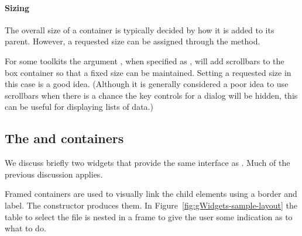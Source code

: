 



\paragraph{Sizing}
The overall size of a  container is typically decided by
how it is added to its parent. However, a requested size can be assigned
through the  method. 


For some toolkits the argument ,
when specified as , will add scrollbars to the box
container so that a fixed size can be maintained. Setting a requested
size in this case is a good idea. (Although it is generally
considered a poor idea to use scrollbars when there is a chance the
key controls for a dialog will be hidden, this can be useful for
displaying lists of data.)






\subsection{The  and  containers}
\label{sec:gWidgets-decorated-cont}

We discuss briefly two widgets that provide the same interface as
. Much of the previous discussion applies.

Framed containers are used to visually link the child elements using a
border and label. The  constructor produces
them. In Figure~\ref{fig:gWidgets-sample-layout} the table to select
the file is nested in a frame to give the user some indication
as to what to do.

